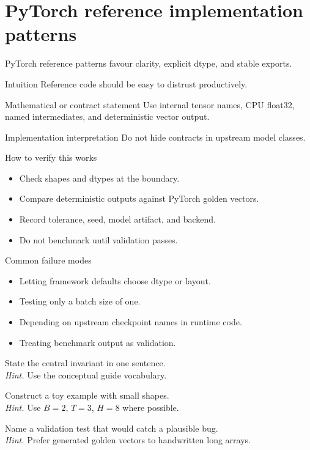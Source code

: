 \chapter{PyTorch reference implementation patterns}
\label{app:pytorch-patterns}
PyTorch reference patterns favour clarity, explicit dtype, and stable exports. \citep{pytorchDocs}



\begin{intuitionbox}{Intuition}
Reference code should be easy to distrust productively.
\end{intuitionbox}

\begin{definitionbox}{Mathematical or contract statement}
Use internal tensor names, CPU float32, named intermediates, and deterministic vector output.
\end{definitionbox}

\begin{implementationbox}{Implementation interpretation}
Do not hide contracts in upstream model classes.
\end{implementationbox}

\begin{verificationbox}{How to verify this works}
\begin{itemize}
\item Check shapes and dtypes at the boundary.
\item Compare deterministic outputs against PyTorch golden vectors.
\item Record tolerance, seed, model artifact, and backend.
\item Do not benchmark until validation passes.
\end{itemize}
\end{verificationbox}

\begin{warningbox}{Common failure modes}
\begin{itemize}
\item Letting framework defaults choose dtype or layout.
\item Testing only a batch size of one.
\item Depending on upstream checkpoint names in runtime code.
\item Treating benchmark output as validation.
\end{itemize}
\end{warningbox}

\begin{chapterexercises}
\item State the central invariant in one sentence.\\
\textit{Hint.} Use the conceptual guide vocabulary.
\item Construct a toy example with small shapes.\\
\textit{Hint.} Use $B=2$, $T=3$, $H=8$ where possible.
\item Name a validation test that would catch a plausible bug.\\
\textit{Hint.} Prefer generated golden vectors to handwritten long arrays.
\end{chapterexercises}

